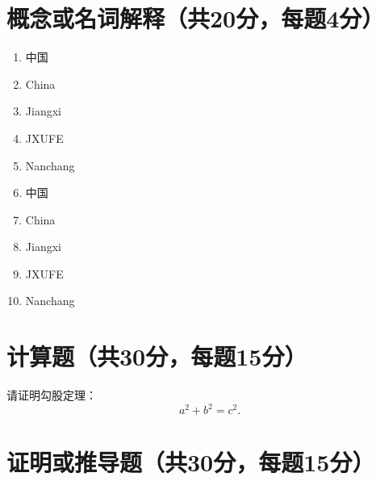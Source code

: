 \documentclass{ctexart}
\begin{document}
\section{概念或名词解释（共20分，每题4分）}
\begin{enumerate}
    \item 中国
    \item China
    \item Jiangxi
    \item JXUFE
    \item Nanchang
    \item 中国
    \item China
    \item Jiangxi
    \item JXUFE
    \item Nanchang
\end{enumerate}

\section{计算题（共30分，每题15分）}
请证明勾股定理：
$$
a^2 + b^2 = c^2.
$$



\section{证明或推导题（共30分，每题15分）}
\end{document}
